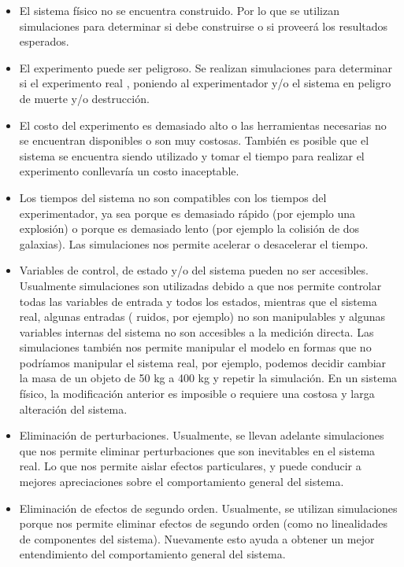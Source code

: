 \begin{itemize}
	\item El sistema físico no se encuentra construido. Por lo que se utilizan simulaciones para determinar si debe construirse o si proveerá los resultados esperados.
	
	\item El experimento puede ser peligroso. Se realizan simulaciones para determinar si el experimento real , poniendo al experimentador y/o el sistema en peligro de muerte y/o destrucción.

	\item El costo del experimento es demasiado alto o las herramientas necesarias no se encuentran disponibles o son muy costosas.
 También es posible que el sistema se encuentra siendo utilizado y tomar el tiempo para realizar el experimento conllevaría un costo inaceptable.

	\item Los tiempos del sistema no son compatibles con los tiempos del experimentador, ya sea porque es demasiado rápido (por ejemplo una explosión) o porque es demasiado lento (por ejemplo la colisión de dos galaxias). Las simulaciones nos permite acelerar o desacelerar el tiempo.

	\item Variables de control, de estado y/o del sistema pueden no ser accesibles. Usualmente simulaciones son utilizadas debido a que nos permite controlar todas las variables de entrada y todos los estados, mientras que el sistema real, algunas entradas ( ruidos, por ejemplo) no son manipulables y algunas variables internas del sistema no son accesibles a la medición directa. Las simulaciones también nos permite manipular el modelo en formas que no podríamos manipular el sistema real, por ejemplo, podemos decidir cambiar la masa de un objeto de 50 kg a 400 kg y repetir la simulación. En un sistema físico, la modificación anterior es imposible o requiere una costosa y larga alteración del sistema.

	\item Eliminación de perturbaciones. Usualmente, se llevan adelante simulaciones que nos permite eliminar perturbaciones que son inevitables en el sistema real. Lo que nos permite aislar efectos particulares, y puede conducir a mejores apreciaciones sobre el comportamiento general del sistema.

	\item Eliminación de efectos de segundo orden. Usualmente, se utilizan simulaciones porque nos permite eliminar efectos de segundo orden (como no linealidades de componentes del sistema). Nuevamente esto ayuda a obtener un mejor entendimiento del comportamiento general del sistema.
\end{itemize}

